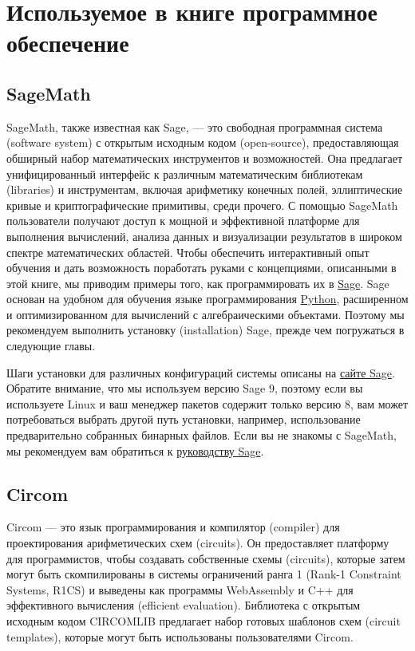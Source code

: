 \chapter{Используемое в книге программное обеспечение}

\section{SageMath}
\label{sagemath_setup}
SageMath, также известная как Sage, — это свободная программная система (software system) с открытым исходным кодом (open-source), предоставляющая обширный набор математических инструментов и возможностей. Она предлагает унифицированный интерфейс к различным математическим библиотекам (libraries) и инструментам, включая арифметику конечных полей, эллиптические кривые и криптографические примитивы, среди прочего. С помощью SageMath пользователи получают доступ к мощной и эффективной платформе для выполнения вычислений, анализа данных и визуализации результатов в широком спектре математических областей. Чтобы обеспечить интерактивный опыт обучения и дать возможность поработать руками с концепциями, описанными в этой книге, мы приводим примеры того, как программировать их в \href{https://www.sagemath.org/}{Sage}. Sage основан на удобном для обучения языке программирования \href{https://www.python.org/}{Python}, расширенном и оптимизированном для вычислений с алгебраическими объектами. Поэтому мы рекомендуем выполнить установку (installation) Sage, прежде чем погружаться в следующие главы.

Шаги установки для различных конфигураций системы описаны на \href{https://doc.sagemath.org/html/en/installation/index.html}{сайте Sage}. Обратите внимание, что мы используем версию Sage 9, поэтому если вы используете Linux и ваш менеджер пакетов содержит только версию 8, вам может потребоваться выбрать другой путь установки, например, использование предварительно собранных бинарных файлов. Если вы не знакомы с SageMath, мы рекомендуем вам обратиться к \href{https://doc.sagemath.org/html/en/tutorial/index.html}{руководству Sage}.

\section{Circom}
\label{circom_setup}
Circom — это язык программирования и компилятор (compiler) для проектирования арифметических схем (circuits). Он предоставляет платформу для программистов, чтобы создавать собственные схемы (circuits), которые затем могут быть скомпилированы в системы ограничений ранга 1 (Rank-1 Constraint Systems, R1CS) и выведены как программы WebAssembly и C++ для эффективного вычисления (efficient evaluation). Библиотека с открытым исходным кодом CIRCOMLIB предлагает набор готовых шаблонов схем (circuit templates), которые могут быть использованы пользователями Circom.

